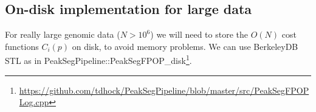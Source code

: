 \documentclass[12pt]{article}
\begin{document}
\subsection{On-disk implementation for large data}

For really large genomic data ($N>10^6$) we will need to store the
$O(N)$ cost functions $C_i(p)$ on disk, to avoid memory problems. We
can use BerkeleyDB STL as in
PeakSegPipeline::PeakSegFPOP\_disk\footnote{\url{https://github.com/tdhock/PeakSegPipeline/blob/master/src/PeakSegFPOPLog.cpp}}.




\end{document}
